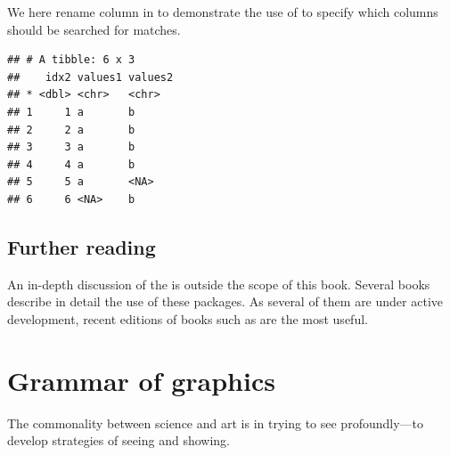 \documentclass[krantz2]{krantz}\usepackage{knitr}
\begin{document}
We here rename column  in  to demonstrate the use of  to specify which columns should be searched for matches.

\begin{knitrout}\footnotesize
{}\color{fgcolor}\begin{kframe}
\begin{alltt}
 \hlkwb{<-}   
\hlstd{(}     \hlstd{=} \hlstd{(} \hlstd{=} \hlstd{))}
\end{alltt}
\begin{verbatim}
## # A tibble: 6 x 3
##    idx2 values1 values2
## * <dbl> <chr>   <chr>
## 1     1 a       b
## 2     2 a       b
## 3     3 a       b
## 4     4 a       b
## 5     5 a       <NA>
## 6     6 <NA>    b
\end{verbatim}
\end{kframe}
\end{knitrout}



\section{Further reading}
An in-depth discussion of the  is outside the scope of this book. Several books describe in detail the use of these packages. As several of them are under active development, recent editions of books such as  \autocite{Wickham2017} are the most useful.









\chapter{Grammar of graphics}\label{chap:R:plotting}

\begin{VF}
The commonality between science and art is in trying to see profoundly---to develop strategies of seeing and showing.

\nocite{Zachry2004}
\end{VF}
\end{document}
